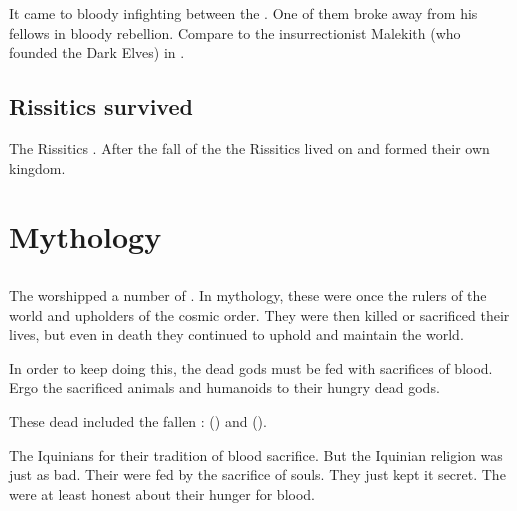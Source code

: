 It came to bloody infighting between the \Ortaican{} \raebari. 
One of them broke away from his fellows in bloody rebellion. 
Compare to the insurrectionist Malekith (who founded the Dark Elves) in \cite{RPG:Warhammer:DarkElves}. 





\subsection{Rissitics survived}
The Rissitics . 
After the fall of the \bacconate{} the Rissitics lived on and formed their own kingdom. 









\section{Mythology}









\subsection{\Dragons}
The \Ortaicans worshipped a number of \dragons. 
In mythology, these \dragons were once the rulers of the world and upholders of the cosmic order. 
They were then killed or sacrificed their lives, but even in death they continued to uphold and maintain the world. 

In order to keep doing this, the dead \dragon gods must be fed with sacrifices of blood. 
Ergo the \Ortaicans sacrificed animals and humanoids to their hungry dead gods. 

These dead \dragons included the fallen \Nechsains: 
 (\Sethicus) and  (\Nexagglachel). 

The Iquinians  for their tradition of blood sacrifice. 
But the Iquinian religion {was just as bad}. 
Their \sephiroth were fed by the sacrifice of souls.
They just kept it secret. 
The \Ortaicans were at least honest about their hunger for blood. 

